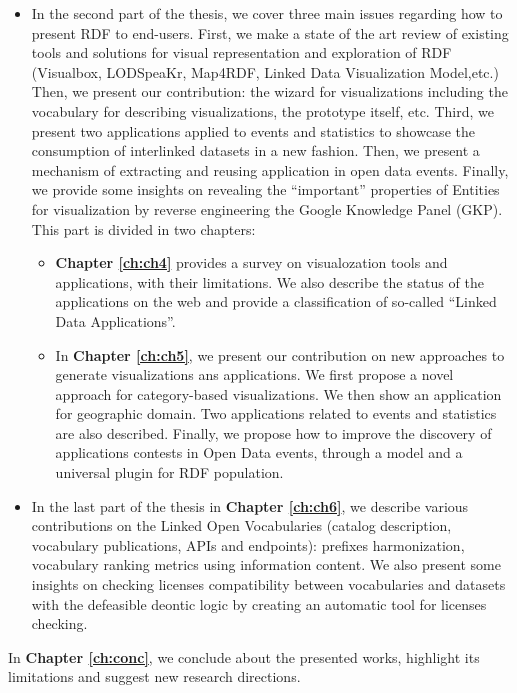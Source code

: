 \begin{itemize}
 \item In the second part of the thesis, we cover three main issues regarding how to present RDF to end-users. First, we make a state of the art review of existing tools and solutions for visual representation and exploration of RDF (Visualbox, LODSpeaKr, Map4RDF, Linked Data Visualization Model,etc.) Then, we present our contribution: the wizard for visualizations including the vocabulary for describing visualizations, the prototype itself, etc. Third, we present two applications applied to events and statistics to showcase the consumption of interlinked datasets in a new fashion. Then, we present a mechanism of extracting and reusing application in open data events. Finally, we provide some insights on revealing the ``important'' properties of Entities for visualization by reverse engineering the Google Knowledge Panel (GKP). This part is divided in two chapters:
 \begin{itemize}
 \item \textbf{Chapter \ref{ch:ch4}} provides a survey on visualozation tools and applications, with their limitations. We also describe the status of the applications on the web and provide a classification of so-called ``Linked Data Applications''.
 \item  In \textbf{Chapter \ref{ch:ch5}}, we present our contribution on new approaches to generate visualizations ans applications. We first propose a novel approach for category-based visualizations. We then show an application for geographic domain. Two applications related to events and statistics are also described. Finally, we propose how to improve the discovery of applications contests in Open Data events, through a model and a universal plugin for RDF population. 
 \end{itemize}
 \item In the last part of the thesis in \textbf{Chapter \ref{ch:ch6}}, we describe various contributions on the Linked Open Vocabularies (catalog description, vocabulary publications, APIs and endpoints): prefixes harmonization, vocabulary ranking metrics using information content. We also present some insights on checking licenses compatibility between vocabularies and datasets with the defeasible deontic logic by creating an automatic tool for licenses checking. 
\end{itemize}

 In \textbf{Chapter \ref{ch:conc}}, we conclude about the presented works, highlight its limitations and suggest new research directions.